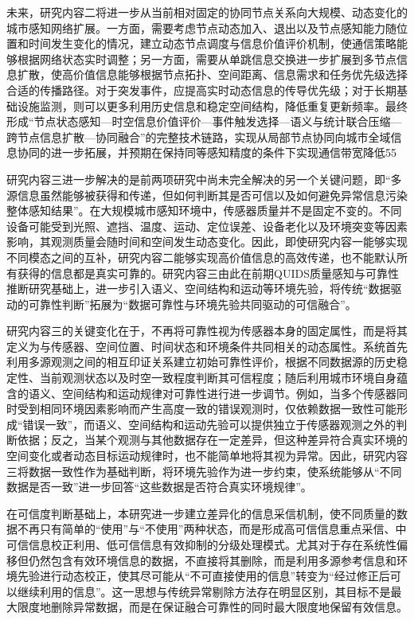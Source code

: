 未来，研究内容二将进一步从当前相对固定的协同节点关系向大规模、动态变化的城市感知网络扩展。一方面，需要考虑节点动态加入、退出以及节点感知能力随位置和时间发生变化的情况，建立动态节点调度与信息价值评价机制，使通信策略能够根据网络状态实时调整；另一方面，需要从单跳信息交换进一步扩展到多节点信息扩散，使高价值信息能够根据节点拓扑、空间距离、信息需求和任务优先级选择合适的传播路径。对于突发事件，应提高实时动态信息的传导优先级；对于长期基础设施监测，则可以更多利用历史信息和稳定空间结构，降低重复更新频率。最终形成“节点状态感知—时空信息价值评价—事件触发选择—语义与统计联合压缩—跨节点信息扩散—协同融合”的完整技术链路，实现从局部节点协同向城市全域信息协同的进一步拓展，并预期在保持同等感知精度的条件下实现通信带宽降低55%

研究内容三进一步解决的是前两项研究中尚未完全解决的另一个关键问题，即“多源信息虽然能够被获得和传递，但如何判断其是否可信以及如何避免异常信息污染整体感知结果”。在大规模城市感知环境中，传感器质量并不是固定不变的。不同设备可能受到光照、遮挡、温度、运动、定位误差、设备老化以及环境突变等因素影响，其观测质量会随时间和空间发生动态变化。因此，即使研究内容一能够实现不同模态之间的互补，研究内容二能够实现高价值信息的高效传递，也不能默认所有获得的信息都是真实可靠的。研究内容三由此在前期QUIDS质量感知与可靠性推断研究基础上，进一步引入语义、空间结构和运动等环境先验，将传统“数据驱动的可靠性判断”拓展为“数据可靠性与环境先验共同驱动的可信融合”。

研究内容三的关键变化在于，不再将可靠性视为传感器本身的固定属性，而是将其定义为与传感器、空间位置、时间状态和环境条件共同相关的动态属性。系统首先利用多源观测之间的相互印证关系建立初始可靠性评价，根据不同数据源的历史稳定性、当前观测状态以及时空一致程度判断其可信程度；随后利用城市环境自身蕴含的语义、空间结构和运动规律对可靠性进行进一步调节。例如，当多个传感器同时受到相同环境因素影响而产生高度一致的错误观测时，仅依赖数据一致性可能形成“错误一致”，而语义、空间结构和运动先验可以提供独立于传感器观测之外的判断依据；反之，当某个观测与其他数据存在一定差异，但这种差异符合真实环境的空间变化或者动态目标运动规律时，也不能简单地将其视为异常。因此，研究内容三将数据一致性作为基础判断，将环境先验作为进一步约束，使系统能够从“不同数据是否一致”进一步回答“这些数据是否符合真实环境规律”。

在可信度判断基础上，本研究进一步建立差异化的信息采信机制，使不同质量的数据不再只有简单的“使用”与“不使用”两种状态，而是形成高可信信息重点采信、中可信信息校正利用、低可信信息有效抑制的分级处理模式。尤其对于存在系统性偏移但仍然包含有效环境信息的数据，不直接将其删除，而是利用多源参考信息和环境先验进行动态校正，使其尽可能从“不可直接使用的信息”转变为“经过修正后可以继续利用的信息”。这一思想与传统异常剔除方法存在明显区别，其目标不是最大限度地删除异常数据，而是在保证融合可靠性的同时最大限度地保留有效信息。

